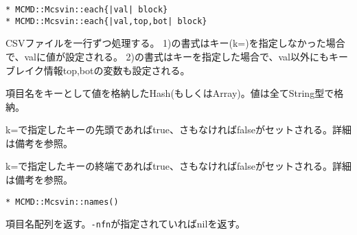 {\Large
\begin{verbatim}
* MCMD::Mcsvin::each{|val| block}
* MCMD::Mcsvin::each{|val,top,bot| block}
\end{verbatim}
}

CSVファイルを一行ずつ処理する。
1)の書式はキー(k=)を指定しなかった場合で、valに値が設定される。
2)の書式はキーを指定した場合で、val以外にもキーブレイク情報top,botの変数も設定される。
\begin{description}
\setlength{\itemindent}{0mm}
\item[val ] 項目名をキーとして値を格納したHash(もしくはArray)。値は全てString型で格納。
\item[top ] k=で指定したキーの先頭であればtrue、さもなければfalseがセットされる。詳細は備考を参照。
\item[bot ] k=で指定したキーの終端であればtrue、さもなければfalseがセットされる。詳細は備考を参照。
\end{description}

%

{\Large
\begin{verbatim}
* MCMD::Mcsvin::names()
\end{verbatim}
}

項目名配列を返す。\verb|-nfn|が指定されていればnilを返す。

